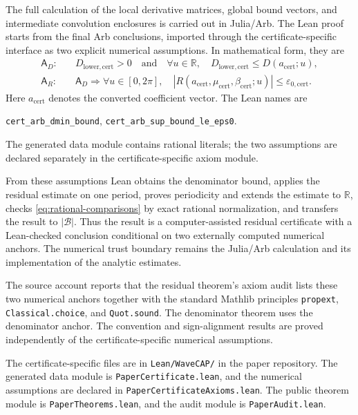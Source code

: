 \documentclass[11pt]{article}
\numberwithin{equation}{section}
\newcommand{\code}[1]{\texttt{#1}}
\begin{document}
The full calculation of the local derivative matrices, global bound
vectors, and intermediate convolution enclosures is carried out in
Julia/Arb. The Lean proof starts from the final Arb conclusions, imported
through the certificate-specific interface as two explicit numerical
assumptions. In mathematical form, they are
\begin{align}
 \mathsf A_D:\quad& D_{\mathrm{lower,cert}}>0
 \quad\text{and}\quad
 \forall u\in\mathbb R,\quad
 D_{\mathrm{lower,cert}}\leq D(a_{\mathrm{cert}};u),
 \label{eq:anchor-D}\\
 \mathsf A_R:\quad&\mathsf A_D\Longrightarrow
 \forall u\in[0,2\pi],\quad
 |R(a_{\mathrm{cert}},\mu_{\mathrm{cert}},\beta_{\mathrm{cert}};u)|
 \leq\varepsilon_{0,\mathrm{cert}}.
 \label{eq:anchor-R}
\end{align}
Here $a_{\mathrm{cert}}$ denotes the converted coefficient vector.
The Lean names are
\begin{center}
 \code{cert\_arb\_dmin\_bound},\qquad
 \code{cert\_arb\_sup\_bound\_le\_eps0}.
\end{center}
The generated data module contains rational literals; the two assumptions
are declared separately in the certificate-specific axiom module.

From these assumptions Lean obtains the denominator bound, applies the
residual estimate on one period, proves periodicity and extends the
estimate to $\mathbb R$, checks \eqref{eq:rational-comparisons} by exact
rational normalization, and transfers the result to $|\mathcal B|$.
Thus the result is a computer-assisted residual certificate with a
Lean-checked conclusion conditional on two externally computed numerical
anchors. The numerical trust boundary remains the Julia/Arb calculation
and its implementation of the analytic estimates.

The source account reports that the residual theorem's axiom audit lists
these two numerical anchors together with the standard Mathlib principles
\code{propext}, \code{Classical.choice}, and \code{Quot.sound}. The
denominator theorem uses the denominator anchor. The convention and
sign-alignment results are proved independently of the certificate-specific
numerical assumptions.

The certificate-specific files are in \code{Lean/WaveCAP/} in the paper
repository. The generated data module is \code{PaperCertificate.lean},
and the numerical assumptions are declared in
\code{PaperCertificateAxioms.lean}. The public theorem module is
\code{PaperTheorems.lean}, and the audit module is \code{PaperAudit.lean}.
\end{document}
